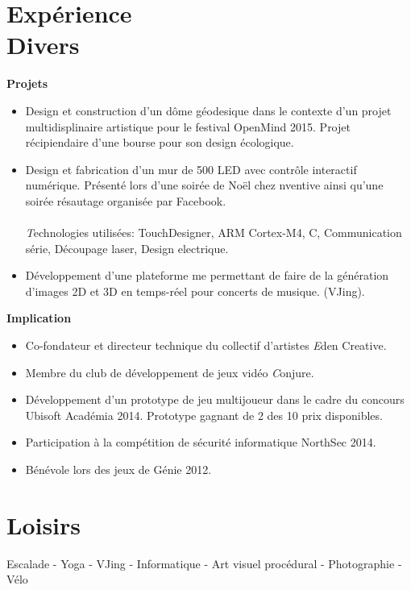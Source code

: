 \documentclass[margin,line]{res}
\begin{document}
\begin{resume}
  \section{\sc Expérience\\ Divers}
   {\bf Projets}\hfill
  \begin{itemize}
    \item Design et construction d'un dôme géodesique dans le contexte d'un projet multidisplinaire artistique pour le festival OpenMind 2015. Projet récipiendaire d'une bourse pour son design écologique.
    \item Design et fabrication d'un mur de 500 LED avec contrôle interactif numérique. Présenté lors d'une soirée de Noël chez nventive ainsi qu'une soirée résautage organisée par Facebook.
          \\\\{\emph Technologies utilisées:} TouchDesigner, ARM Cortex-M4, C, Communication série, Découpage laser, Design electrique.
    \item Développement d'une plateforme me permettant de faire de la génération d'images 2D et 3D en temps-réel pour concerts de musique. (VJing).
  \end{itemize}
  {\bf Implication} \hfill
  \begin{itemize}
    \item Co-fondateur et directeur technique du collectif d'artistes {\emph Eden Creative}.
    \item Membre du club de développement de jeux vidéo {\emph Conjure}.
    \item Développement d'un prototype de jeu multijoueur dans le cadre du concours Ubisoft Académia 2014. Prototype gagnant de 2 des 10 prix disponibles.
    \item Participation à la compétition de sécurité informatique NorthSec 2014.
    \item Bénévole lors des jeux de Génie 2012.
  \end{itemize}


  \section{\sc Loisirs}
  Escalade - Yoga - VJing -  Informatique - Art visuel procédural - Photographie - Vélo


\end{resume}
\end{document}
